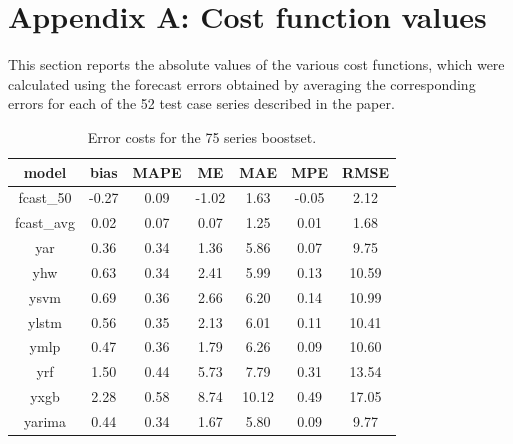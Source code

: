 \documentclass[11pt]{article}
\begin{document}

\appendix
\vspace*{-10pt}
\section{Appendix A: Cost function values} \label{app:errcost}

This section reports the absolute values of the various cost functions, which were calculated using the forecast errors obtained by averaging the corresponding errors for each of the 52 test case series described in the paper.

\begin{table}[h]
	\centering
	\renewcommand{\arraystretch}{1.0}
	\begin{tabular}{ccccccc}
		model & bias & MAPE & ME & MAE & MPE & RMSE \\
		\hline
		fcast\_50   &-0.27 & 0.09 &-1.02 & 1.63 &-0.05 &  2.12 \\
		fcast\_avg  & 0.02 & 0.07 & 0.07 & 1.25 & 0.01 &  1.68 \\
		yar         & 0.36 & 0.34 & 1.36 & 5.86 & 0.07 &  9.75 \\
		yhw         & 0.63 & 0.34 & 2.41 & 5.99 & 0.13 & 10.59 \\
		ysvm        & 0.69 & 0.36 & 2.66 & 6.20 & 0.14 & 10.99 \\
		ylstm       & 0.56 & 0.35 & 2.13 & 6.01 & 0.11 & 10.41 \\
		ymlp        & 0.47 & 0.36 & 1.79 & 6.26 & 0.09 & 10.60 \\
		yrf         & 1.50 & 0.44 & 5.73 & 7.79 & 0.31 & 13.54 \\
		yxgb        & 2.28 & 0.58 & 8.74 &10.12 & 0.49 & 17.05 \\
		yarima      & 0.44 & 0.34 & 1.67 & 5.80 & 0.09 &  9.77 \\
		\hline
	\end{tabular}
	\caption{Error costs for the 75 series boostset.}
	\label{table:app75}
\end{table}
\end{document}
